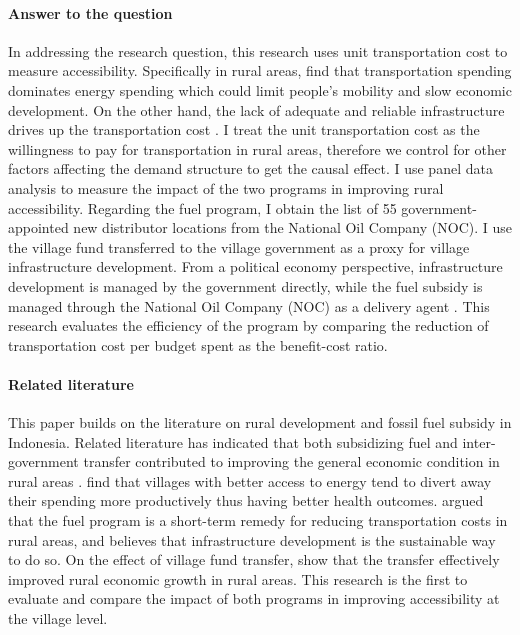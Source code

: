 \documentclass[letterpaper,12pt,leqno]{article}
\begin{document}
\paragraph{Answer to the question} In addressing the research question, this research uses unit transportation cost to measure accessibility. Specifically in rural areas, \citet{sambodo_2019} find that transportation spending dominates energy spending which could limit people's mobility and slow economic development. On the other hand, the lack of adequate and reliable infrastructure drives up the transportation cost \citep{sandee_2016}. I treat the unit transportation cost as the willingness to pay for transportation in rural areas, therefore we control for other factors affecting the demand structure to get the causal effect. I use panel data analysis to measure the impact of the two programs in improving rural accessibility. Regarding the fuel program, I obtain the list of 55 government-appointed new distributor locations from the National Oil Company (NOC). I use the village fund transferred to the village government as a proxy for village infrastructure development. From a political economy perspective, infrastructure development is managed by the government directly, while the fuel subsidy is managed through the National Oil Company (NOC) as a delivery agent \citep{ichsan_2022}. This research evaluates the efficiency of the program by comparing the reduction of transportation cost per budget spent as the benefit-cost ratio.

\paragraph{Related literature} This paper builds on the literature on rural development and fossil fuel subsidy in Indonesia. Related literature has indicated that both subsidizing fuel and inter-government transfer contributed to improving the general economic condition in rural areas \citep{sambodo_2019,ichsan_2021,hartojo_2022}. \citep{sambodo_2019} find that villages with better access to energy tend to divert away their spending more productively thus having better health outcomes. \citep{ichsan_2021} argued that the fuel program is a short-term remedy for reducing transportation costs in rural areas, and believes that infrastructure development is the sustainable way to do so. On the effect of village fund transfer, \citet{hartojo_2022} show that the transfer effectively improved rural economic growth in rural areas. This research is the first to evaluate and compare the impact of both programs in improving accessibility at the village level.
\end{document}
